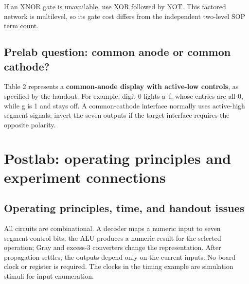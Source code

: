 \documentclass[a4paper,11pt]{article}
\begin{document}
\begin{center}\end{center}

If an XNOR gate is unavailable, use XOR followed by NOT. This factored network
is multilevel, so its gate cost differs from the independent two-level SOP term count.
\subsection{Prelab question: common anode or common cathode?}
Table 2 represents a \textbf{common-anode display with active-low controls}, as specified
by the handout. For example, digit 0 lights a--f, whose entries are all 0, while g is 1
and stays off. A common-cathode interface normally uses active-high segment signals;
invert the seven outputs if the target interface requires the opposite polarity.

\clearpage\section{Postlab: operating principles and experiment connections}
\subsection{Operating principles, time, and handout issues}
All circuits are combinational. A decoder maps a numeric input to seven segment-control
bits; the ALU produces a numeric result for the selected operation; Gray and excess-3
converters change the representation. After propagation settles, the outputs depend
only on the current inputs. No board clock or register is required. The clocks in the
timing example are simulation stimuli for input enumeration.
\end{document}

